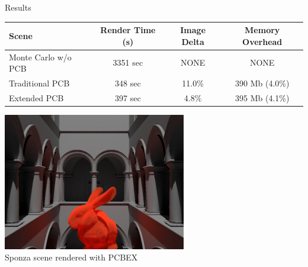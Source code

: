 \documentclass[10pt,compress,professionalfont]{beamer}
\begin{document}
\begin{frame}{Results}

    \begin{center}
    \setlength{\tabcolsep}{2pt}
    \begin{tabular}{ | l | c | c | c | }
      \hline                       
      Scene & Render Time (s) & Image Delta & Memory Overhead \\
      \hline                  
      Monte Carlo w/o PCB & 3351 sec & NONE & NONE \\
      Traditional PCB & 348 sec & 11.0\% & 390 Mb (4.0\%) \\
      Extended PCB & 397 sec & 4.8\% & 395 Mb (4.1\%)  \\
      \hline  
    \end{tabular}
    \end{center}

\end{frame}




\begin{frame}[c]{}

    {\centering
    \includegraphics[width=80mm]{../img/sponza}\\
    }
    {\centering\scriptsize Sponza scene rendered with PCBEX\\}

\end{frame}
\end{document}
